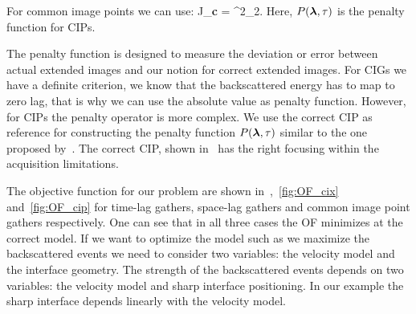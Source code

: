 For common image points we can use:
\beq
J_{\bf c} =   ^2_2.
\eeq
%
Here, $P({\boldsymbol{\lambda}},\tau)$ is the penalty function for CIPs.

The penalty function is designed to measure the deviation or error between actual extended images and our notion for correct 
extended images. For CIGs we have a definite criterion, we know that the backscattered energy has to map
to zero lag, that is why we can use the absolute value as penalty function. However, for CIPs the 
penalty operator is more complex. We use the correct CIP as reference for constructing the penalty function $P({\boldsymbol{\lambda}},\tau)$ similar
to the one proposed by~\citep{tony:cwp12}. The correct CIP, shown in~ has the right focusing within the acquisition limitations.

The objective function for our problem are shown in~,~\ref{fig:OF_cix} and~\ref{fig:OF_cip} for time-lag gathers, space-lag gathers and
common image point gathers respectively. One can see that in all three cases the OF minimizes at the correct model. If we want to optimize the model such as 
we maximize the backscattered events we need to consider two variables: the velocity model and the interface geometry. The strength of the backscattered
events depends on two variables: the velocity model and sharp interface positioning. In our example the sharp interface depends linearly with the 
velocity model.







